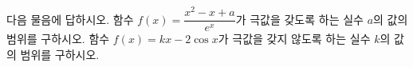 다음 물음에 답하시오.
 함수 $f(x)=\dfrac{x^2-x+a}{e^x}$가 극값을 갖도록 하는 실수 $a$의 값의 범위를 구하시오.
 함수 $f(x)=kx-2\cos x$가 극값을 갖지 않도록 하는 실수 $k$의 값의 범위를 구하시오.
